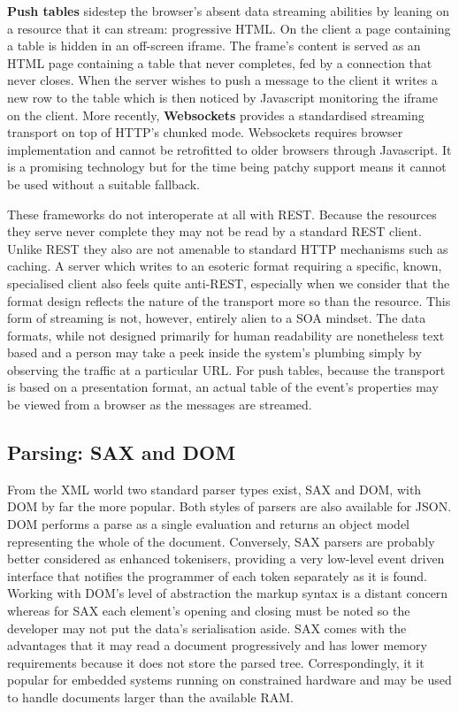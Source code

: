 \documentclass[12pt, ]{article}
\begin{document}
\textbf{Push tables} sidestep the browser's absent data streaming
abilities by leaning on a resource that it can stream: progressive HTML.
On the client a page containing a table is hidden in an off-screen
iframe. The frame's content is served as an HTML page containing a table
that never completes, fed by a connection that never closes. When the
server wishes to push a message to the client it writes a new row to the
table which is then noticed by Javascript monitoring the iframe on the
client. More recently, \textbf{Websockets} provides a standardised
streaming transport on top of HTTP's chunked mode. Websockets requires
browser implementation and cannot be retrofitted to older browsers
through Javascript. It is a promising technology but for the time being
patchy support means it cannot be used without a suitable fallback.

These frameworks do not interoperate at all with REST. Because the
resources they serve never complete they may not be read by a standard
REST client. Unlike REST they also are not amenable to standard HTTP
mechanisms such as caching. A server which writes to an esoteric format
requiring a specific, known, specialised client also feels quite
anti-REST, especially when we consider that the format design reflects
the nature of the transport more so than the resource. This form of
streaming is not, however, entirely alien to a SOA mindset. The data
formats, while not designed primarily for human readability are
nonetheless text based and a person may take a peek inside the system's
plumbing simply by observing the traffic at a particular URL. For push
tables, because the transport is based on a presentation format, an
actual table of the event's properties may be viewed from a browser as
the messages are streamed.

\subsection{Parsing: SAX and DOM}\label{parsing-sax-and-dom}

From the XML world two standard parser types exist, SAX and DOM, with
DOM by far the more popular. Both styles of parsers are also available
for JSON. DOM performs a parse as a single evaluation and returns an
object model representing the whole of the document. Conversely, SAX
parsers are probably better considered as enhanced tokenisers, providing
a very low-level event driven interface that notifies the programmer of
each token separately as it is found. Working with DOM's level of
abstraction the markup syntax is a distant concern whereas for SAX each
element's opening and closing must be noted so the developer may not put
the data's serialisation aside. SAX comes with the advantages that it
may read a document progressively and has lower memory requirements
because it does not store the parsed tree. Correspondingly, it it
popular for embedded systems running on constrained hardware and may be
used to handle documents larger than the available RAM.
\end{document}
